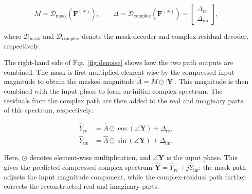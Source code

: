 \documentclass[a4paper,fleqn]{cas-sc}
\begin{document}


\begin{equation}
M=\mathcal D_{\mathrm{mask}}\!\left(\mathbf F^{(N)}\right),
\qquad
\Delta=\mathcal D_{\mathrm{complex}}\!\left(\mathbf F^{(N)}\right)
=
\begin{bmatrix}
\Delta_{\mathrm{re}}\\
\Delta_{\mathrm{im}}
\end{bmatrix}, \tag{16}\label{eq:decoder_outputs}
\end{equation}



\noindent where $\mathcal D_{\mathrm{mask}}$ and $\mathcal D_{\mathrm{complex}}$ denote the mask decoder and complex-residual decoder, respectively.



The right-hand side of Fig.~\ref{fig:denoise} shows how the two path outputs are combined. The mask is first multiplied element-wise by the compressed input magnitude to obtain the masked magnitude $\hat A=M\odot|\mathbf Y|$. This magnitude is then combined with the input phase to form an initial complex spectrum. The residuals from the complex path are then added to the real and imaginary parts of this spectrum, respectively:



\begin{equation}
\begin{aligned}
\hat Y_{\mathrm{re}}
&=
\hat A\odot\cos\!\left(\angle\mathbf Y\right)
+\Delta_{\mathrm{re}},\\
\hat Y_{\mathrm{im}}
&=
\hat A\odot\sin\!\left(\angle\mathbf Y\right)
+\Delta_{\mathrm{im}},
\end{aligned} \tag{17}\label{eq:complex_reconstruction}
\end{equation}



\noindent Here, $\odot$ denotes element-wise multiplication, and $\angle\mathbf Y$ is the input phase. This gives the predicted compressed complex spectrum $\hat{\mathbf Y}=\hat Y_{\mathrm{re}}+j\hat Y_{\mathrm{im}}$: the mask path adjusts the input magnitude component, while the complex-residual path further corrects the reconstructed real and imaginary parts.
\end{document}
